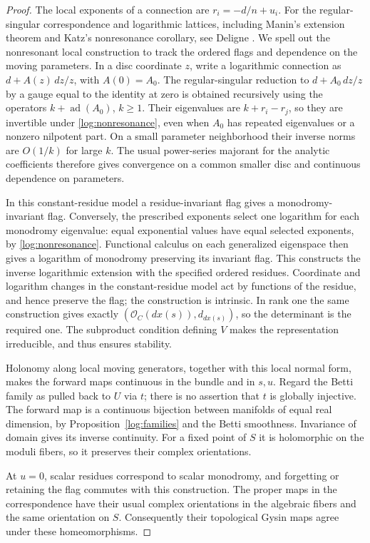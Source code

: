 \begin{proof}
The local exponents of a connection are $r_i=-d/n+u_i$.
For the regular-singular correspondence and logarithmic lattices, including
Manin's extension theorem and Katz's nonresonance corollary, see
Deligne \cite[II, Proposition~5.4, Remark~5.5(ii),
Corollary~5.6, and Theorem~5.9]{Deligne1970}. We spell out the
nonresonant local construction to track the ordered flags and dependence
on the moving parameters.
In a disc coordinate $z$, write a logarithmic connection as
$d+A(z)\,dz/z$, with $A(0)=A_0$.  The regular-singular reduction
to $d+A_0\,dz/z$ by a gauge equal to the identity at zero is obtained
recursively using the operators $k+\operatorname{ad}(A_0)$, $k\geq1$.
Their eigenvalues are $k+r_i-r_j$, so they are invertible under
\eqref{log:nonresonance}, even when $A_0$ has repeated eigenvalues or
a nonzero nilpotent part.  On a small parameter neighborhood their
inverse norms are $O(1/k)$ for large $k$.  The usual power-series
majorant for the analytic coefficients therefore gives convergence
on a common smaller disc and continuous dependence on parameters.

In this constant-residue model a residue-invariant flag gives a
monodromy-invariant flag.  Conversely, the prescribed exponents select
one logarithm for each monodromy eigenvalue: equal exponential values
have equal selected exponents, by \eqref{log:nonresonance}.  Functional
calculus on each generalized eigenspace then gives a logarithm of
monodromy preserving its invariant flag.  This constructs the inverse
logarithmic extension with the specified ordered residues.  Coordinate
and logarithm changes in the constant-residue model act by functions
of the residue, and hence preserve the flag; the construction is
intrinsic.  In rank one the same construction gives exactly
$(\mathcal O_C(d x(s)),d_{d x(s)})$, so the determinant is the required
one.  The subproduct condition defining $V$ makes the representation
irreducible, and thus ensures stability.

Holonomy along local moving generators, together with this local
normal form, makes the forward maps continuous in the bundle and
in $s,u$.  Regard the Betti family as pulled back to $U$ via $t$;
there is no assertion that $t$ is globally injective.  The forward
map is a continuous bijection between manifolds of equal real
dimension, by Proposition~\ref{log:families} and the Betti
smoothness.  Invariance of domain gives its inverse continuity.
For a fixed point of $S$ it is holomorphic on the moduli fibers,
so it preserves their complex orientations.

At $u=0$, scalar residues correspond to scalar monodromy, and
forgetting or retaining the flag commutes with this construction.
The proper maps in the correspondence have their usual complex
orientations in the algebraic fibers and the same orientation on
$S$.  Consequently their topological Gysin maps agree under these
homeomorphisms.
\end{proof}

